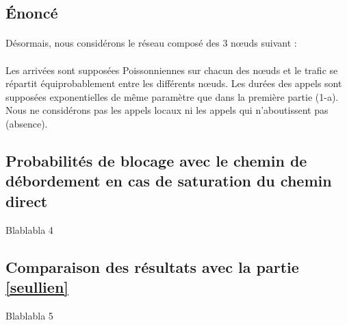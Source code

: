         \subsection{Énoncé}
%
            \paragraph{}
Désormais, nous considérons le réseau composé des 3 nœuds suivant :
%
            \paragraph{}
Les arrivées sont supposées Poissonniennes sur chacun des nœuds et le trafic se répartit équiprobablement entre les différents nœuds.
Les durées des appels sont supposées exponentielles de même paramètre que dans la première partie (1-a).
Nous ne considérons pas les appels locaux ni les appels qui n'aboutissent pas (absence).
%
        \subsection{Probabilités de blocage avec le chemin de débordement en cas de saturation du chemin direct}
Blablabla 4
%
        \subsection{Comparaison des résultats avec la partie \ref{seullien}}
Blablabla 5

%
